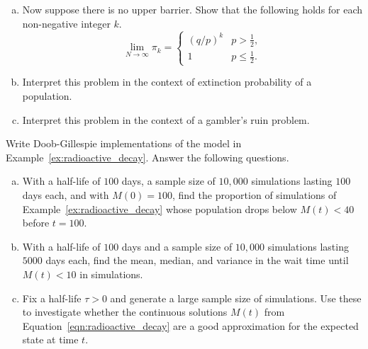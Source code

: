 \begin{exercises}
\begin{enumerate}[(a)]
\item Now suppose there is no upper barrier. Show that the following holds for each non-negative integer $k$.
\[
\lim_{N\to\infty} \pi_k = \begin{cases} (q/p)^k & p > \tfrac{1}{2}, \\ 1 & p \leq \tfrac{1}{2}. \end{cases}
\]
    \item Interpret this problem in the context of extinction probability of a population.
    \item Interpret this problem in the context of a gambler's ruin problem.

\end{enumerate}


\item \label{ex:hw_radioactive_decay_sim}
Write Doob-Gillespie implementations of the model in Example~\ref{ex:radioactive_decay}. Answer the following questions.
\begin{enumerate}[(a)]
\item With a half-life of $100$ days, a sample size of $10,000$ simulations lasting $100$ days each, and with $M(0) = 100$, find the proportion of simulations of Example~\ref{ex:radioactive_decay} whose population drops below $M(t) < 40$ before $t = 100$.
\item With a half-life of $100$ days and a sample size of $10,000$ simulations lasting $5000$ days each, find the mean, median, and variance in the wait time until $M(t) < 10$ in simulations.
\item Fix a half-life $\tau > 0$ and generate a large sample size of simulations. Use these to investigate whether the continuous solutions $M(t)$ from Equation~\ref{eqn:radioactive_decay} are a good approximation for the expected state at time $t$.
\end{enumerate}



\end{exercises}
